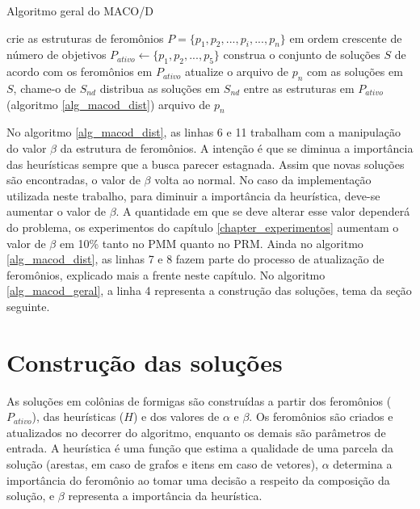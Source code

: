 \begin{algorithm}
	\caption{Algoritmo geral do MACO/D}
	\label{alg_macod_geral}
	\begin{algorithmic}[1]
		\State crie as estruturas de feromônios $P = \{p_1, p_2, ..., p_i, ..., p_n\}$ em ordem crescente de número de objetivos
		\State $P_{ativo} \gets \{p_1, p_2, ..., p_5\}$
			\State construa o conjunto de soluções $S$ de acordo com os feromônios em $P_{ativo}$
			\State atualize o arquivo de $p_n$ com as soluções em $S$, chame-o de $S_{nd}$
			\State distribua as soluções em $S_{nd}$ entre as estruturas em $P_{ativo}$ (algoritmo \ref{alg_macod_dist})
		\EndWhile
		\State \Return arquivo de $p_n$
	\end{algorithmic}
\end{algorithm}

No algoritmo \ref{alg_macod_dist}, as linhas 6 e 11 trabalham com a manipulação do valor $\beta$ da estrutura de feromônios. A intenção é que se diminua a importância das heurísticas sempre que a busca parecer estagnada. Assim que novas soluções são encontradas, o valor de $\beta$ volta ao normal. No caso da implementação utilizada neste trabalho, para diminuir a importância da heurística, deve-se aumentar o valor de $\beta$. A quantidade em que se deve alterar esse valor dependerá do problema, os experimentos do capítulo \ref{chapter_experimentos} aumentam o valor de $\beta$ em 10\% tanto no PMM quanto no PRM. Ainda no algoritmo \ref{alg_macod_dist}, as linhas 7 e 8 fazem parte do processo de atualização de feromônios, explicado mais a frente neste capítulo. No algoritmo \ref{alg_macod_geral}, a linha 4 representa a construção das soluções, tema da seção seguinte.

\section{Construção das soluções}

As soluções em colônias de formigas são construídas a partir dos feromônios ($P_{ativo}$), das heurísticas ($H$) e dos valores de $\alpha$ e $\beta$. Os feromônios são criados e atualizados no decorrer do algoritmo, enquanto os demais são parâmetros de entrada. A heurística é uma função que estima a qualidade de uma parcela da solução (arestas, em caso de grafos e itens em caso de vetores), $\alpha$ determina a importância do feromônio ao tomar uma decisão a respeito da composição da solução, e $\beta$ representa a importância da heurística.

